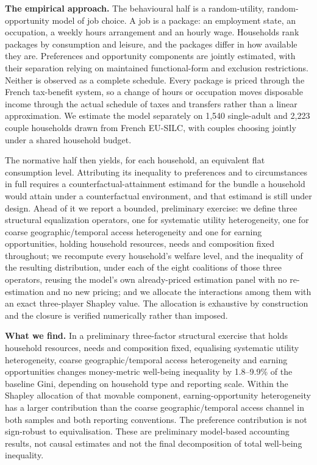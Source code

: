 \documentclass[11pt,a4paper]{article}
\begin{document}
\textbf{The empirical approach.} The behavioural half is a random-utility, random-opportunity model of job choice. A job is a package: an employment state, an occupation, a weekly hours arrangement and an hourly wage. Households rank packages by consumption and leisure, and the packages differ in how available they are. Preferences and opportunity components are jointly estimated, with their separation relying on maintained functional-form and exclusion restrictions. Neither is observed as a complete schedule. Every package is priced through the French tax-benefit system, so a change of hours or occupation moves disposable income through the actual schedule of taxes and transfers rather than a linear approximation. We estimate the model separately on 1,540 single-adult and 2,223 couple households drawn from French EU-SILC, with couples choosing jointly under a shared household budget.

The normative half then yields, for each household, an equivalent flat consumption level. Attributing its inequality to preferences and to circumstances in full requires a counterfactual-attainment estimand for the bundle a household would attain under a counterfactual environment, and that estimand is still under design. Ahead of it we report a bounded, preliminary exercise: we define three structural equalization operators, one for systematic utility heterogeneity, one for coarse geographic/temporal access heterogeneity and one for earning opportunities, holding household resources, needs and composition fixed throughout; we recompute every household's welfare level, and the inequality of the resulting distribution, under each of the eight coalitions of those three operators, reusing the model's own already-priced estimation panel with no re-estimation and no new pricing; and we allocate the interactions among them with an exact three-player Shapley value. The allocation is exhaustive by construction and the closure is verified numerically rather than imposed.

\textbf{What we find.} In a preliminary three-factor structural exercise that holds household resources, needs and composition fixed, equalising systematic utility heterogeneity, coarse geographic/temporal access heterogeneity and earning opportunities changes money-metric well-being inequality by 1.8--9.9\% of the baseline Gini, depending on household type and reporting scale. Within the Shapley allocation of that movable component, earning-opportunity heterogeneity has a larger contribution than the coarse geographic/temporal access channel in both samples and both reporting conventions. The preference contribution is not sign-robust to equivalisation. These are preliminary model-based accounting results, not causal estimates and not the final decomposition of total well-being inequality.
\end{document}
